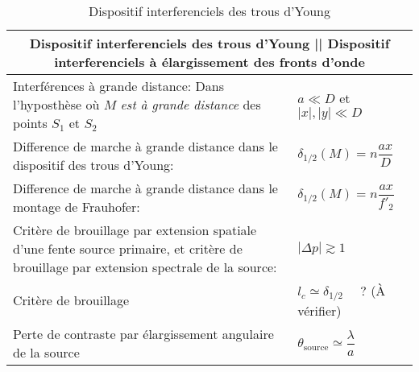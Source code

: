\documentclass[10pt,a4paper,titlepage,landscape]{article}
\renewcommand{\arraystretch}{2}
\begin{document}
\begin{table}[H]
    \centering
    \renewcommand{\arraystretch}{1.5} %
    \setlength{\tabcolsep}{8pt} %
    \begin{tabular}{@{}|p{9cm}|p{10cm}@{}|}

        \multicolumn{2}{c}{\textbf{Dispositif interferenciels des trous d'Young || Dispositif interferenciels à élargissement des fronts d'onde}} \\ \hline

        Interférences à grande distance: Dans l'hyposthèse où $M$ \textit{est à grande distance} des points $S_1$ et $S_2$& $a \ll D $ et $|x|, |y| \ll D$ \\ \hline
        Difference de marche à grande distance dans le dispositif des trous d'Young: & $\delta_{1/2}(M) = n\dfrac{ax}{D}$ \\ \hline
        Difference de marche à grande distance dans le montage de Frauhofer: & $\delta_{1/2}(M) = n\dfrac{ax}{f'_2}$ \\ \hline
        Critère de brouillage par extension spatiale d'une fente source primaire, et critère de brouillage par extension spectrale de la source: & $|\Delta p|\gtrsim 1$ \\ \hline
        Critère de brouillage & $l_c \simeq \delta_{1/2} $ \ \ $?$ (À vérifier)\\ \hline 
        Perte de contraste par élargissement angulaire de la source & $\theta_{\mathrm{source}}\simeq \dfrac{\lambda}{a}$\\ \hline
    \end{tabular}
\caption{Dispositif interferenciels des trous d'Young}
\label{tab:intermichel}
\end{table}
\end{document}
